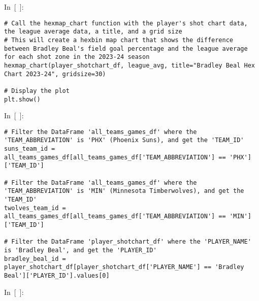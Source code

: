 In~{[}~{]}:

\begin{verbatim}
# Call the hexmap_chart function with the player's shot chart data, the league average data, a title, and a grid size
# This will create a hexbin map chart that shows the difference between Bradley Beal's field goal percentage and the league average for each shot zone in the 2023-24 season
hexmap_chart(player_shotchart_df, league_avg, title="Bradley Beal Hex Chart 2023-24", gridsize=30)

# Display the plot
plt.show()
\end{verbatim}

In~{[}~{]}:

\begin{verbatim}
# Filter the DataFrame 'all_teams_games_df' where the 'TEAM_ABBREVIATION' is 'PHX' (Phoenix Suns), and get the 'TEAM_ID'
suns_team_id = all_teams_games_df[all_teams_games_df['TEAM_ABBREVIATION'] == 'PHX']['TEAM_ID']

# Filter the DataFrame 'all_teams_games_df' where the 'TEAM_ABBREVIATION' is 'MIN' (Minnesota Timberwolves), and get the 'TEAM_ID'
twolves_team_id = all_teams_games_df[all_teams_games_df['TEAM_ABBREVIATION'] == 'MIN']['TEAM_ID']

# Filter the DataFrame 'player_shotchart_df' where the 'PLAYER_NAME' is 'Bradley Beal', and get the 'PLAYER_ID'
bradley_beal_id = player_shotchart_df[player_shotchart_df['PLAYER_NAME'] == 'Bradley Beal']['PLAYER_ID'].values[0]
\end{verbatim}

In~{[}~{]}:


